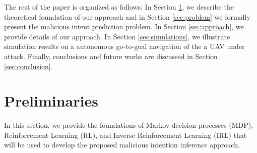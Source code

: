 \documentclass[letterpaper, 10 pt, conference]{ieeeconf}  %
\begin{document}
The rest of the paper is organized as follows: In Section \ref{sec:Preliminaries}, we describe the theoretical foundation of our approach and in Section \ref{sec:problem} we formally present the malicious intent prediction problem. In Section \ref{sec:approach}, we provide details of our approach. In Section \ref{sec:simulations}, we illustrate simulation results on a autonomous go-to-goal navigation of the a UAV under attack. Finally, conclusions and future works are discussed in Section \ref{sec:conclusion}.

\section{Preliminaries}\label{sec:Preliminaries}
In this section, we provide the foundations of Markov decision processes (MDP), Reinforcement Learning (RL), and Inverse Reinforcement Learning (IRL) that will be used to develop the proposed malicious intention inference approach.
\end{document}
